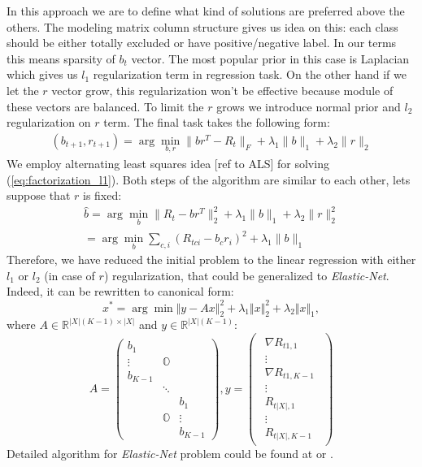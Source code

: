 \documentclass{article}
\begin{document}
In this approach we are to define what kind of solutions are preferred above the others. The modeling matrix column structure gives us idea on this: each class should be either totally excluded or have positive/negative label. In our terms this means sparsity of $b_t$ vector. The most popular prior in this case is Laplacian which gives us $l_1$ regularization term in regression task. On the other hand if we let the $r$ vector grow, this regularization won't be effective because module of these vectors are balanced. To limit the $r$ grows we introduce normal prior and $l_2$ regularization on $r$ term. The final task takes the following form:
\begin{multline}
(b_{t+1},r_{t+1}) = \arg \min_{b,r} \|b r^T - R_t\|_F + \lambda_1 \|b\|_1 + \lambda_2 \|r\|_2
\label{eq:factorization_l1}
\end{multline}
We employ alternating least squares idea [ref to ALS] for solving (\ref{eq:factorization_l1}). Both steps of the algorithm are similar to each other, lets suppose that $r$ is fixed:
\begin{multline*}
	\hat{b} = \arg\min_{b}\|R_t-br^T\|_2^{2} + \lambda_1 \|b\|_1 + \lambda_2 \|r\|_2^2 \\
	= \arg\min_{b}\sum_{c,i}\left(R_{tci}-b_cr_i\right)^{2} + \lambda_1 \|b\|_1
	\label{eq:elastic-net-argmin}
\end{multline*}
Therefore, we have reduced the initial problem to the linear regression with either $l_1$ or $l_2$ (in case of $r$) regularization, that could be generalized to \emph{Elastic-Net}. Indeed, it can be rewritten to canonical form:
 \begin{equation*}
x^{*}=\arg\min\Vert y-Ax\Vert_{2}^{2}+\lambda_{1}\Vert x\Vert_{2}^{2}+\lambda_{2}\Vert x\Vert_{1},\label{eq:elastic-net-canon-argmin}
\end{equation*}
where $A \in \mathbb{R}^{|X|(K-1)\times |X|}$ and $y \in \mathbb{R}^{|X|(K-1)}$:
\[
A =
\begin{pmatrix}
	b_{1}     		& 				&		  \\
	\vdots			& \mathbb{O}  	&		  \\
	b_{K-1}			& 				&		  \\
					& \ddots		&		  \\
					&   			& b_{1}	  \\
					& \mathbb{O}	& \vdots  \\
					& 				& b_{K-1}
\end{pmatrix},
y=\begin{pmatrix}\begin{array}{l}
	\nabla R_{t1,1}		\\
	\vdots				\\
	\nabla R_{t1,K-1}	\\

	\vdots				\\
	
	R_{t|X|,1}		\\
	\vdots				\\
	R_{t|X|,K-1}
\end{array}\end{pmatrix}
\]
Detailed algorithm for \emph{Elastic-Net} problem could be found at \cite{elasticnet05} or \cite{Hastie_theelements}.
\end{document}
